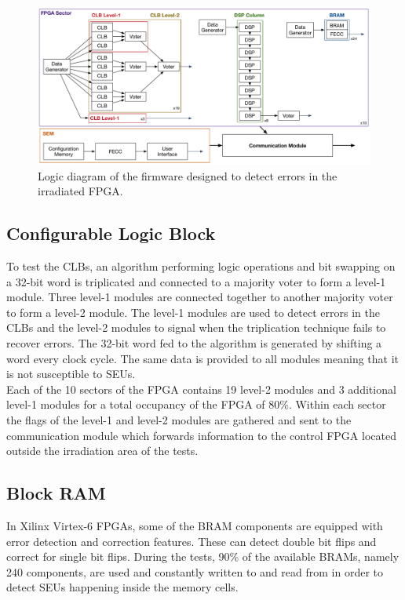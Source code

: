     \begin{figure}[h!]
      \centering
      \includegraphics[width=\textwidth]{img/II-5-irradiation/firmware}
      \caption{Logic diagram of the firmware designed to detect errors in the irradiated FPGA.}
      \label{fig:II-5-firmware}
    \end{figure}

    \subsection{Configurable Logic Block}

      To test the CLBs, an algorithm performing logic operations and bit swapping on a 32-bit word is triplicated and connected to a majority voter to form a level-1 module. Three level-1 modules are connected together to another majority voter to form a level-2 module. The level-1 modules are used to detect errors in the CLBs and the level-2 modules to signal when the triplication technique fails to recover errors. The 32-bit word fed to the algorithm is generated by shifting a word every clock cycle. The same data is provided to all modules meaning that it is not susceptible to SEUs. \\

      Each of the 10 sectors of the FPGA contains 19 level-2 modules and 3 additional level-1 modules for a total occupancy of the FPGA of 80\%. Within each sector the flags of the level-1 and level-2 modules are gathered and sent to the communication module which forwards information to the control FPGA located outside the irradiation area of the tests.

    \subsection{Block RAM}

      In Xilinx Virtex-6 FPGAs, some of the BRAM components are equipped with error detection and correction features. These can detect double bit flips and correct for single bit flips. During the tests, 90\% of the available BRAMs, namely 240 components, are used and constantly written to and read from in order to detect SEUs happening inside the memory cells.

